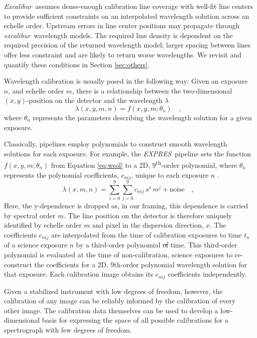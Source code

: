 \documentclass[twocolumn,table,xcolor,trackchanges]{aastex63} %
\newcommand{\project}[1]{\textsl{#1}}
\newcommand{\name}{\project{excalibur}}
\newcommand{\Name}{\project{Excalibur}}
\newcommand{\acronym}[1]{{\small{#1}}}
\newcommand{\expres}{\project{\acronym{EXPRES}}}
\providecommand{\DIFadd}[1]{{\protect\color{blue}\uwave{#1}}} %
\providecommand{\DIFdel}[1]{{\protect\color{red}\sout{#1}}}                      %
\providecommand{\DIFaddbegin}{} %
\providecommand{\DIFaddend}{} %
\providecommand{\DIFdelbegin}{} %
\providecommand{\DIFdelend}{} %
\begin{document}
\Name\ \DIFaddbegin \DIFadd{also }\DIFaddend assumes dense-enough calibration line coverage with well-fit line centers to provide sufficient constraints on an interpolated wavelength solution across an echelle order.  Upstream errors in line center positions may propagate through \name\ wavelength models.  The required line density is dependent on the required precision of the returned wavelength model; larger spacing between lines offer less constraint and are likely to return worse wavelengths.  We revisit and quantify these conditions in Section \ref{sec:others}.

Wavelength calibration is usually posed in the following way: Given an exposure $n$, and echelle order $m$, there is a relationship between
the two-dimensional $(x,y)$-position on the detector and the
wavelength $\lambda$
\begin{equation}
\lambda(x,y,m,n) = f(x,y,m;\theta_{n})
\quad ,
\label{eq:wsol}
\end{equation}
where $\theta_{n}$ represents the parameters describing the wavelength solution for a given exposure.

Classically, pipelines employ polynomials to construct smooth wavelength solutions for each exposure.  For example, the \expres\ pipeline sets the function $f(x,y,m;\theta_{n})$ from Equation \ref{eq:wsol} to a 2D, 9\textsuperscript{th}-order polynomial, where $\theta_{n}$ represents the polynomial coefficients, $c_{nij}$, unique to each exposure $n$ \citep{petersburg2020}.
\begin{equation}
\lambda(x,m,n) = \sum_{i=0}^9\sum_{j=0}^9 c_{nij}\, x^i\,m^j + \mathrm{noise}
\quad ,
\label{eq:poly_wsol}
\end{equation}
Here, the y-dependence is dropped as, in our framing, this dependence is carried by spectral order $m$.  The line position on the detector is therefore uniquely identified by echelle order $m$ and pixel in the dispersion direction, $x$.  The coefficients $c_{nij}$ are interpolated from the time of calibration exposures to time $t_n$ of a science exposure $n$ by a third-order polynomial \DIFdelbegin \DIFdel{of }\DIFdelend \DIFaddbegin \DIFadd{with respect to }\DIFaddend time.  This third-order polynomial is evaluated at the time of non-calibration, science exposures to re-construct the coefficients for a 2D, 9th-order polynomial wavelength solution for that exposure.  Each calibration image obtains its $c_{nij}$ coefficients independently.

Given a stabilized instrument with low degrees of freedom, however, the calibration of any image can be reliably informed by the calibration of every other image.  The calibration data themselves can be used to develop a low-dimensional basis for expressing the space of all possible calibrations for a spectrograph with few degrees of freedom.
\end{document}
